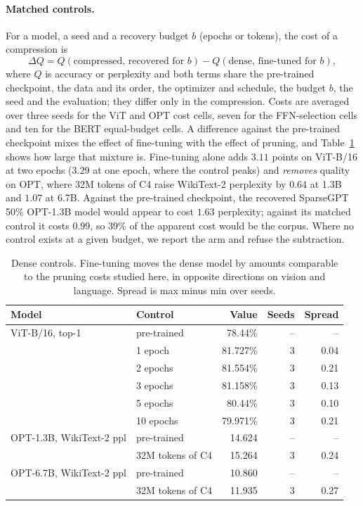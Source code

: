 \documentclass[11pt,a4paper]{article}
\begin{document}
\paragraph{Matched controls.} For a model, a seed and a recovery budget $b$ (epochs or tokens), the cost of a compression is
\begin{equation*}
\Delta Q = Q(\text{compressed, recovered for } b) - Q(\text{dense, fine-tuned for } b),
\end{equation*}
where $Q$ is accuracy or perplexity and both terms share the pre-trained checkpoint, the data and its order, the optimizer and schedule, the budget $b$, the seed and the evaluation; they differ only in the compression. Costs are averaged over three seeds for the ViT and OPT cost cells, seven for the FFN-selection cells and ten for the BERT equal-budget cells. A difference against the pre-trained checkpoint mixes the effect of fine-tuning with the effect of pruning, and Table~\ref{tab:controls} shows how large that mixture is. Fine-tuning alone adds $3.11$ points on ViT-B/16 at two epochs ($3.29$ at one epoch, where the control peaks) and \emph{removes} quality on OPT, where 32M tokens of C4 raise WikiText-2 perplexity by $0.64$ at 1.3B and $1.07$ at 6.7B. Against the pre-trained checkpoint, the recovered SparseGPT 50\% OPT-1.3B model would appear to cost $1.63$ perplexity; against its matched control it costs $0.99$, so 39\% of the apparent cost would be the corpus. Where no control exists at a given budget, we report the arm and refuse the subtraction.

\begin{table}[t]
\centering
\caption{Dense controls. Fine-tuning moves the dense model by amounts comparable to the pruning costs studied here, in opposite directions on vision and language. Spread is max minus min over seeds.}
\label{tab:controls}
\begin{tabular}{llrrr}
\toprule
Model & Control & Value & Seeds & Spread \\
\midrule
ViT-B/16, top-1 & pre-trained & 78.44\% & -- & -- \\
 & 1 epoch & 81.727\% & 3 & 0.04 \\
 & 2 epochs & 81.554\% & 3 & 0.21 \\
 & 3 epochs & 81.158\% & 3 & 0.13 \\
 & 5 epochs & 80.44\% & 3 & 0.10 \\
 & 10 epochs & 79.971\% & 3 & 0.21 \\
OPT-1.3B, WikiText-2 ppl & pre-trained & 14.624 & -- & -- \\
 & 32M tokens of C4 & 15.264 & 3 & 0.24 \\
OPT-6.7B, WikiText-2 ppl & pre-trained & 10.860 & -- & -- \\
 & 32M tokens of C4 & 11.935 & 3 & 0.27 \\
\bottomrule
\end{tabular}
\end{table}
\end{document}

